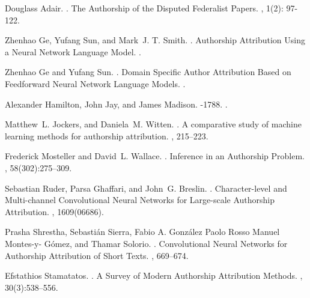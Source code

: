 \documentclass[11pt]{article}
\begin{document}
\begin{thebibliography}{}
	
	Douglass Adair.
	.
	\newblock The Authorship of the Disputed Federalist Papers.
	, 1(2): 97-122.

	 Zhenhao Ge, Yufang Sun, and Mark~J. T. Smith.
	.
	\newblock Authorship Attribution Using a Neural Network  Language  Model.
	.
	
	Zhenhao Ge and Yufang Sun.
	.
	\newblock Domain Specific Author Attribution Based on Feedforward Neural Network Language Models.
	.
	
	Alexander Hamilton, John Jay, and James Madison.
	-1788.
	.
	
	Matthew~L. Jockers, and Daniela~M. Witten.
	.
	\newblock A comparative study of machine learning methods for authorship attribution.
	, 215--223.
	
	Frederick Mosteller and David~L. Wallace.
	.
	\newblock Inference in an Authorship Problem.
	, 58(302):275--309.
	
	Sebastian Ruder, Parsa Ghaffari, and John~G. Breslin.
	.
	\newblock Character-level and Multi-channel Convolutional Neural Networks for Large-scale Authorship Attribution.
	, 1609(06686).
	
	Prasha Shrestha, Sebasti{\'a}n Sierra, Fabio A. Gonz{\'a}lez Paolo Rosso Manuel Montes-y-
	G{\'o}mez, and Thamar Solorio.
	.
	\newblock Convolutional Neural Networks for Authorship Attribution of Short Texts.
	, 669--674.
	
	Efstathios Stamatatos.
	.
	\newblock A Survey of Modern Authorship Attribution Methods.
	, 30(3):538--556.

\end{thebibliography}
\end{document}
